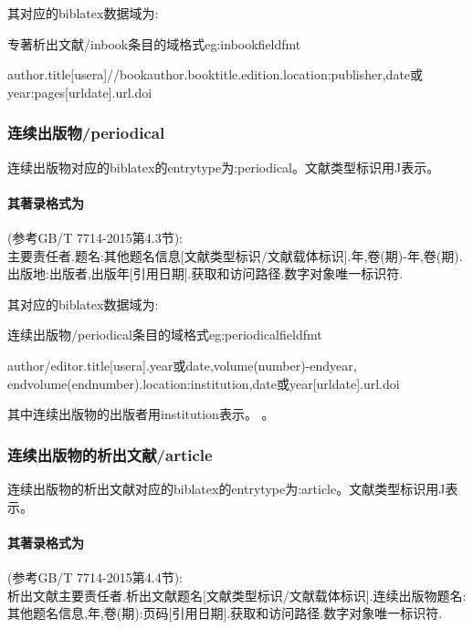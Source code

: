 其对应的biblatex数据域为:
\begin{example}{专著析出文献/inbook条目的域格式}{eg:inbookfieldfmt}
\begin{texlist}
author.title[usera]//bookauthor.booktitle.edition.location:publisher,date或year:pages[urldate].url.doi
\end{texlist}
\end{example}

\subsubsection{连续出版物/periodical}
\begin{refentry}{}{}
连续出版物对应的biblatex的entrytype为:periodical。文献类型标识用J表示。

\paragraph{其著录格式为}(参考GB/T 7714-2015第4.3节):\\
主要责任者.题名:其他题名信息[文献类型标识/文献载体标识].年,卷(期)-年,卷(期).出版地:出版者,出版年[引用日期].获取和访问路径.数字对象唯一标识符.
\end{refentry}

其对应的biblatex数据域为:
\begin{example}{连续出版物/periodical条目的域格式}{eg:periodicalfieldfmt}
\begin{texlist}
author/editor.title[usera].year或date,volume(number)-endyear, endvolume(endnumber).location:institution,date或year[urldate].url.doi
\end{texlist}
\end{example}

其中连续出版物的出版者用institution表示。
。

\subsubsection{连续出版物的析出文献/article}
\begin{refentry}{}{}%
连续出版物的析出文献对应的biblatex的entrytype为:article。文献类型标识用J表示。

\paragraph{其著录格式为}(参考GB/T 7714-2015第4.4节):\\
析出文献主要责任者.析出文献题名[文献类型标识/文献载体标识].连续出版物题名:其他题名信息,年,卷(期):页码[引用日期].获取和访问路径.数字对象唯一标识符.
\end{refentry}

